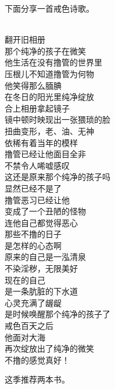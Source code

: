 下面分享一首戒色诗歌。

\begin{poem}[唤醒内心的孩子]
    \begin{multicols}{2}
        \begin{center}~\\
            翻开旧相册 \\ 那个纯净的孩子在微笑 \\ 他生活在没有撸管的世界里 \\ 压根儿不知道撸管为何物 \\ 他笑得那么腼腆 \\ 在冬日的阳光里纯净绽放 \\ 合上相册拿起镜子 \\ 镜中顿时映现出一张猥琐的脸 \\ 扭曲变形，老、油、无神 \\ 依稀有着当年的模样 \\ 撸管已经让他面目全非 \\ 不禁令人唏嘘感叹 \\ 这还是原来那个纯净的孩子吗 \\ 显然已经不是了 \\ 撸管恶习已经让他 \\ 变成了一个丑陋的怪物 \\ 连他自己都觉得恶心 \\ 那些不撸的日子 \\ 是怎样的心态啊 \\ 原来的自己是一泓清泉 \\ 不染淫秽，无限美好 \\ 现在的自己 \\ 是一条肮脏的下水道 \\ 心灵充满了龌龊 \\ 是时候唤醒那个纯净的孩子了 \\ 戒色百天之后 \\ 他面对大海 \\ 再次绽放出了纯净的微笑 \\ 不撸的感觉真好！
        \end{center}
    \end{multicols}
\end{poem}

这季推荐两本书。


